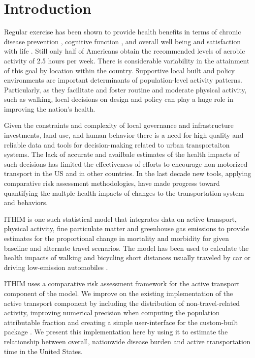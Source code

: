 \documentclass[10pt,letterpaper]{article}\usepackage[]{graphicx}\usepackage[]{color}
\begin{document}
\linenumbers

\section*{Introduction}

Regular exercise has been shown to provide health benefits in terms of
chronic disease prevention \cite{warburton2006}, cognitive function
\cite{hillman2008}, and overall well being and satisfaction with life
\cite{maher2013}. Still only half of Americans obtain the recommended
levels of aerobic activity of 2.5 hours per week. There is
considerable variability in the attainment of this goal by location
within the country. Supportive local built and policy environments are
important determinants of population-level activity
patterns. Particularly, as they facilitate and foster routine and
moderate physical activity, such as walking, local decisions on design
and policy can play a huge role in improving the nation's health.

Given the constraints and complexity of local governance and
infrastructure investments, land use, and human behavior there is a
need for high quality and reliable data and tools for decision-making
related to urban transportaiton systems. The lack of accurate and
availbale estimates of the health impacts of such decisions has
limited the effectiveness of efforts to encourage non-motorized
transport in the US and in other countries. In the last decade new
tools, applying comparative risk assessment methodologies, have made
progress toward quantifying the multple health impacts of changes to
the transportation system and behaviors.

ITHIM is one such statistical model that integrates data on active
transport, physical activity, fine particulate matter and greenhouse
gas emissions to provide estimates for the proportional change in
mortality and morbidity for given baseline and alternate travel
scenarios. The model has been used to calculate the health impacts of
walking and bicycling short distances usually traveled by car or
driving low-emission automobiles \cite{woodcock2013,maizlish2013}.

ITHIM uses a comparative risk assessment framework for the active
transport component of the model.  We improve on the existing
implementation of the active transport component by including the
distribution of non-travel-related activity, improving numerical
precision when computing the population attributable fraction and
creating a simple user-interface for the custom-built \R{} package
\package{}.  We present this implementation here by using it to
estimate the relationship between overall, nationwide disease burden
and active transportation time in the United States.
\end{document}
